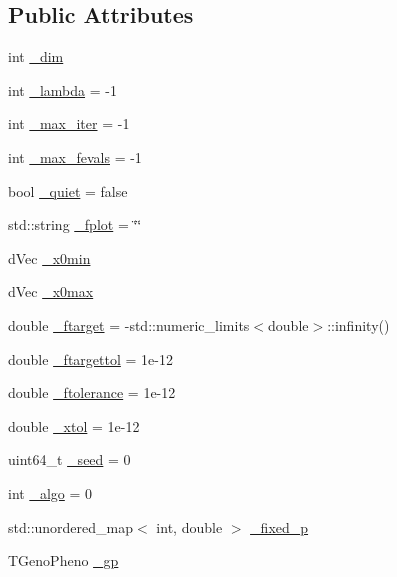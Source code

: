 \subsection*{Public Attributes}
\begin{DoxyCompactItemize}
\item 
int \hyperlink{classlibcmaes_1_1Parameters_affc62ae5c5f1db4f88e4c2dc96387af6}{\-\_\-dim}
\item 
int \hyperlink{classlibcmaes_1_1Parameters_af732f7206f23cbd6ec2bbd4e217a9a2b}{\-\_\-lambda} = -\/1
\item 
int \hyperlink{classlibcmaes_1_1Parameters_a60abfc730c5aa46e42ebd1598b59caa6}{\-\_\-max\-\_\-iter} = -\/1
\item 
int \hyperlink{classlibcmaes_1_1Parameters_ad316488121bd51f62b28e8183d591c9e}{\-\_\-max\-\_\-fevals} = -\/1
\item 
bool \hyperlink{classlibcmaes_1_1Parameters_a6f6dad55c02a23891e3280cad288295a}{\-\_\-quiet} = false
\item 
std\-::string \hyperlink{classlibcmaes_1_1Parameters_aa49511ea00199348ea94f1aa53fe5bc1}{\-\_\-fplot} = \char`\"{}\char`\"{}
\item 
d\-Vec \hyperlink{classlibcmaes_1_1Parameters_aa3bb27467698d9cb7fc7e0a83b48800f}{\-\_\-x0min}
\item 
d\-Vec \hyperlink{classlibcmaes_1_1Parameters_aece9694af9bee78bb13b0994db7ac45e}{\-\_\-x0max}
\item 
double \hyperlink{classlibcmaes_1_1Parameters_a837dbcfba351a043441076a11666f92c}{\-\_\-ftarget} = -\/std\-::numeric\-\_\-limits$<$double$>$\-::infinity()
\item 
double \hyperlink{classlibcmaes_1_1Parameters_af9dde10c81d743c7f684d486f989d1a4}{\-\_\-ftargettol} = 1e-\/12
\item 
double \hyperlink{classlibcmaes_1_1Parameters_ab6c11cc112b5709e9039967e881c808e}{\-\_\-ftolerance} = 1e-\/12
\item 
double \hyperlink{classlibcmaes_1_1Parameters_aaa9e8eedba7d7140d116163b40f653f8}{\-\_\-xtol} = 1e-\/12
\item 
uint64\-\_\-t \hyperlink{classlibcmaes_1_1Parameters_ac6d616c3d5295fec8a0b230592fb767a}{\-\_\-seed} = 0
\item 
int \hyperlink{classlibcmaes_1_1Parameters_a7a5fc681b0c7294ef050ace344f923db}{\-\_\-algo} = 0
\item 
std\-::unordered\-\_\-map$<$ int, double $>$ \hyperlink{classlibcmaes_1_1Parameters_a83fdae9d4bb9b77c8ad955c6aac75086}{\-\_\-fixed\-\_\-p}
\item 
T\-Geno\-Pheno \hyperlink{classlibcmaes_1_1Parameters_ab8e153b4785de9358599caa840b94ef2}{\-\_\-gp}
\end{DoxyCompactItemize}


